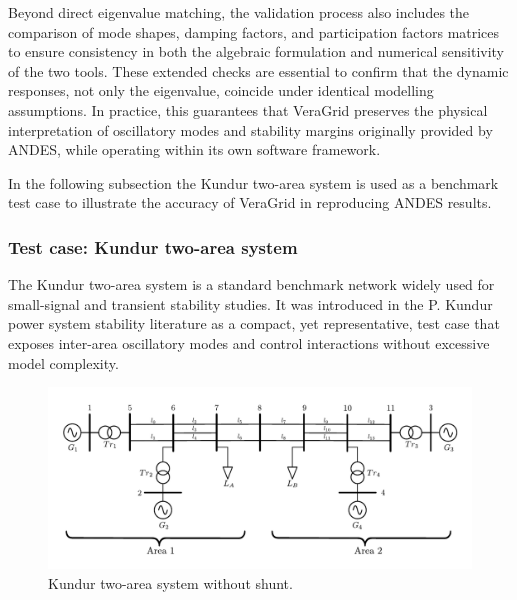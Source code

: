 Beyond direct eigenvalue matching, the validation process also includes the comparison of mode shapes, damping factors, and participation factors
matrices to ensure consistency in both the algebraic formulation and numerical sensitivity of the two tools. These extended checks are essential to 
confirm that the dynamic responses, not only the eigenvalue, coincide under identical modelling assumptions. In practice, this guarantees that VeraGrid 
preserves the physical interpretation of oscillatory modes and stability margins originally provided by ANDES, while operating within its own software framework.

In the following subsection the Kundur two-area system is used as a benchmark test case to illustrate the accuracy of VeraGrid in reproducing ANDES results.


\subsubsection{Test case: Kundur two-area system}

The Kundur two-area system is a standard benchmark network widely used for small-signal and transient stability studies.
 It was introduced in the P. Kundur power system stability literature \cite{StabilityAndControlKundur} as a compact, yet representative, test case that exposes 
 inter-area oscillatory modes and control interactions without excessive model complexity.

\begin{figure}[h!]
    \centering
    \includegraphics[width=1\linewidth]{inkscape_svg/Kundur_system_no_shunt.pdf}
    \caption{Kundur two-area system without shunt.}
    \label{fig:kundur_system}
\end{figure}

